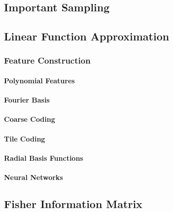 		\subsection{Important Sampling} %

		\subsection{Linear Function Approximation} %

			\subsubsection{Feature Construction} %

				\paragraph{Polynomial Features} %

				\paragraph{Fourier Basis} %

				\paragraph{Coarse Coding} %

				\paragraph{Tile Coding} %

				\paragraph{Radial Basis Functions} %

				\paragraph{Neural Networks} %

		\subsection{Fisher Information Matrix} %

